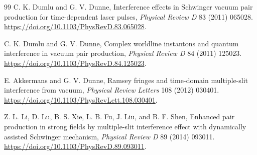 \documentclass[anonymous]{iopjournal}
\begin{document}
\begin{thebibliography}{99}
C. K. Dumlu and G. V. Dunne, Interference effects in Schwinger vacuum pair production for time-dependent laser pulses, \textit{Physical Review D} 83 (2011) 065028. \url{https://doi.org/10.1103/PhysRevD.83.065028}.

C. K. Dumlu and G. V. Dunne, Complex worldline instantons and quantum interference in vacuum pair production, \textit{Physical Review D} 84 (2011) 125023. \url{https://doi.org/10.1103/PhysRevD.84.125023}.

E. Akkermans and G. V. Dunne, Ramsey fringes and time-domain multiple-slit interference from vacuum, \textit{Physical Review Letters} 108 (2012) 030401. \url{https://doi.org/10.1103/PhysRevLett.108.030401}.

Z. L. Li, D. Lu, B. S. Xie, L. B. Fu, J. Liu, and B. F. Shen, Enhanced pair production in strong fields by multiple-slit interference effect with dynamically assisted Schwinger mechanism, \textit{Physical Review D} 89 (2014) 093011. \url{https://doi.org/10.1103/PhysRevD.89.093011}.
\end{thebibliography}
\end{document}
